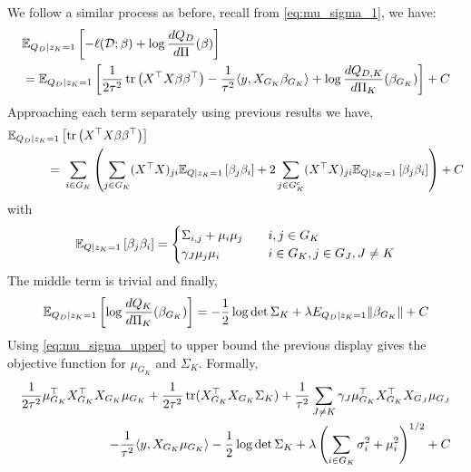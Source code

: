 \documentclass[12pt]{article}
\begin{document}
We follow a similar process as before, recall from \eqref{eq:mu_sigma_1}, we have:
{\allowdisplaybreaks
\begin{align}
& \mathbb{E}_{Q_D  | z_K = 1}  \left[ 
    - \ell(\mathcal{D}; \beta) + \log \frac{dQ_D}{d\Pi}(\beta) 
\right]  \nonumber \\
& = 
    \mathbb{E}_{Q_D | z_K = 1} \left[ 
	\frac{1}{2\tau^2} \operatorname{tr} \left( X^\top X \beta \beta^\top \right) 
	- \frac{1}{\tau^2} \langle y, X_{G_K} \beta_{G_K} \rangle 
	+ \log \frac{dQ_{D,K}}{d\Pi_K}(\beta_{G_K})
    \right] + C \label{eq:QD_mu_sigma}
\end{align}
}
Approaching each term separately using previous results we have,
\begin{align}
    \mathbb{E}_{Q_D | z_K = 1} & \left[ 
	\operatorname{tr} \left( X^\top X \beta \beta^\top \right) 
    \right] \\
=&\
    \sum_{i \in G_K} \left( 
	\sum_{j \in G_K} (X^\top X)_{ji} 
	    \mathbb{E}_{Q | z_K = 1} \left[ \beta_j \beta_i \right] 
	+ 
	2 \sum_{j \in G_K^c} (X^\top X)_{ji} 
	    \mathbb{E}_{Q | z_K = 1} \left[ \beta_j \beta_i \right] 
    \right ) + C \nonumber
\end{align}
with
\begin{equation}
    \mathbb{E}_{Q | z_K = 1} \left[ \beta_j \beta_i \right] = \begin{cases}
	\Sigma_{i, j} + \mu_{i} \mu_{j} & \quad i,j \in G_K \\
	\gamma_J \mu_{j}\mu_{i} 	& \quad i \in G_K, j \in G_J, J \neq K
    \end{cases}
\end{equation}
The middle term is trivial and finally,
\begin{equation}
    \mathbb{E}_{Q_D | z_K = 1 } \left[ \log \frac{dQ_K}{d\Pi_K} (\beta_{G_K}) \right]
    = -\frac{1}{2} \log \det \Sigma_K + \lambda E_{Q_D | z_K = 1} \| \beta_{G_K} \| + C
\end{equation}
Using \eqref{eq:mu_sigma_upper} to upper bound the previous display gives the objective function for $\mu_{G_K}$ and $\Sigma_K$. Formally,
\begin{equation} \label{eq:QD_mu_sigma_obj}
\begin{aligned}
    \frac{1}{2\tau^2} 
    \mu_{G_K}^\top X_{G_K}^\top X_{G_K} \mu_{G_K}
+
    \frac{1}{2\tau^2} 
    \operatorname{tr}( X_{G_K}^\top X_{G_K} \Sigma_K)
+
    \frac{1}{\tau^2} 
    \sum_{J \neq K} 
	\gamma_J \mu_{G_K}^\top X_{G_K}^\top X_{G_J} \mu_{G_J} \\
-
    \frac{1}{\tau^2}
    \langle y, X_{G_K} \mu_{G_K} \rangle 
-	
    \frac{1}{2} \log \det \Sigma_K 
+
    \lambda \left( \sum_{i \in G_K} 
	\sigma_i^2 + \mu_i^2
    \right)^{1/2} + C
\end{aligned}
\end{equation}
\end{document}
